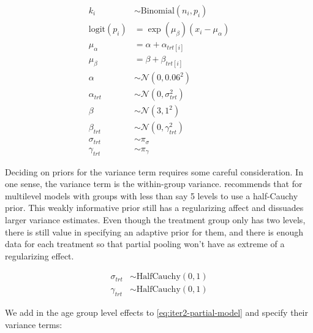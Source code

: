 \documentclass[11pt, oneside, openany]{scrbook}
\begin{document}

\begin{equation}
\begin{split}
k_i &\sim \mathrm{Binomial}(n_i, p_i) \\
\mathrm{logit}(p_i) &= \exp(\mu_\beta) (x_i - \mu_\alpha) \\
\mu_\alpha &= \alpha + \alpha_{trt[i]} \\
\mu_\beta &= \beta + \beta_{trt[i]} \\
\alpha &\sim \mathcal{N}(0, 0.06^2) \\
\alpha_{trt} &\sim \mathcal{N}(0, \sigma_{trt}^2) \\
\beta &\sim \mathcal{N}(3, 1^2) \\
\beta_{trt} &\sim \mathcal{N}(0, \gamma_{trt}^2) \\
\sigma_{trt} &\sim \pi_{\sigma} \\
\gamma_{trt} &\sim \pi_{\gamma}
\end{split}
\label{eq:iter2-partial-model}
\end{equation}

Deciding on priors for the variance term requires some careful consideration. In one sense, the variance term is the within-group variance. \citet{gelman2006prior} recommends that for multilevel models with groups with less than say 5 levels to use a half-Cauchy prior. This weakly informative prior still has a regularizing affect and dissuades larger variance estimates. Even though the treatment group only has two levels, there is still value in specifying an adaptive prior for them, and there is enough data for each treatment so that partial pooling won't have as extreme of a regularizing effect.


\begin{align*}
\sigma_{trt} &\sim \mathrm{HalfCauchy}(0, 1) \\
\gamma_{trt} &\sim \mathrm{HalfCauchy}(0, 1)
\end{align*}

We add in the age group level effects to \eqref{eq:iter2-partial-model} and specify their variance terms:

\end{document}
